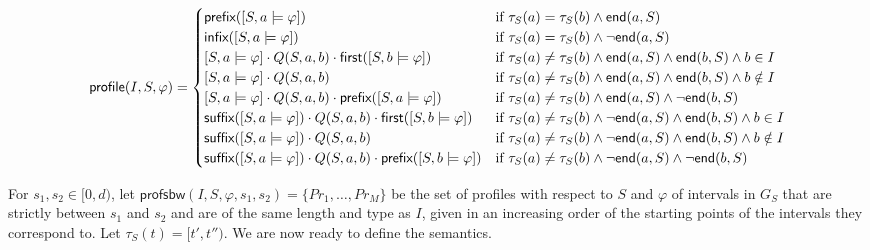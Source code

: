 \scriptsize
\begin{equation*} 
	\mathsf{profile}(I, S, \varphi) =
	\begin{cases}
		\textsf{prefix}([S, a \models \varphi]) &\text{if $\tau_S(a) = \tau_S(b) \land \mathsf{end}(a, S)$} \\
		\textsf{infix}([S, a \models \varphi]) &\text{if $\tau_S(a) = \tau_S(b) \land \lnot\mathsf{end}(a, S)$} \\
		[S, a \models \varphi] \cdot Q(S, a, b) \cdot \textsf{first}([S, b \models \varphi]) &\text{if $\tau_S(a) \neq \tau_S(b) \land \mathsf{end}(a, S) \land \mathsf{end}(b, S) \land b \in I$} \\
		[S, a \models \varphi] \cdot Q(S, a, b) &\text{if $\tau_S(a) \neq \tau_S(b) \land \mathsf{end}(a, S) \land \mathsf{end}(b, S) \land b \notin I$} \\
		[S, a \models \varphi] \cdot Q(S, a, b) \cdot \textsf{prefix}([S, a \models \varphi]) &\text{if $\tau_S(a) \neq \tau_S(b) \land \mathsf{end}(a, S) \land \lnot\mathsf{end}(b, S)$} \\
		\textsf{suffix}([S, a \models \varphi]) \cdot Q(S, a, b) \cdot \textsf{first}([S, b \models \varphi]) &\text{if $\tau_S(a) \neq \tau_S(b) \land \lnot\mathsf{end}(a, S) \land \mathsf{end}(b, S) \land b \in I$} \\
		\textsf{suffix}([S, a \models \varphi]) \cdot Q(S, a, b) &\text{if $\tau_S(a) \neq \tau_S(b) \land \lnot\mathsf{end}(a, S) \land \mathsf{end}(b, S) \land b \notin I$} \\
		\textsf{suffix}([S, a \models \varphi]) \cdot Q(S, a, b) \cdot \textsf{prefix}([S, b \models \varphi]) &\text{if $\tau_S(a) \neq \tau_S(b) \land \lnot\mathsf{end}(a, S) \land \lnot\mathsf{end}(b, S)$} 
	\end{cases}
\end{equation*}
\normalsize


For $s_1, s_2 \in [0,d)$, let $\mathsf{profsbw}(I, S, \varphi, s_1, s_2) = \{\textit{Pr}_1, \ldots, \textit{Pr}_M\}$ be the set of profiles with respect to $S$ and $\varphi$ of intervals in $G_S$ that are strictly between $s_1$ and $s_2$ and are of the same length and type as $I$, given in an increasing order of the starting points of the intervals they correspond to. 
Let $\tau_S(t) = [t', t'')$.
We are now ready to define the semantics.

